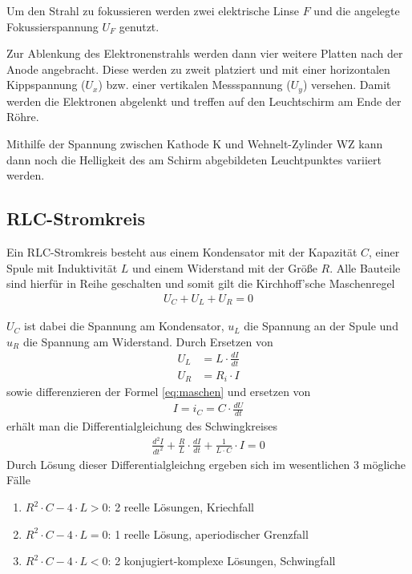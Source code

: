 \documentclass{article}
\begin{document}
Um den Strahl zu fokussieren werden zwei elektrische Linse $F$ und die angelegte Fokussierspannung $U_F$ genutzt.


Zur Ablenkung des Elektronenstrahls werden dann vier weitere Platten nach der Anode angebracht. Diese werden zu zweit platziert und mit einer horizontalen Kippspannung ($U_x$) bzw. einer vertikalen Messspannung ($U_y$) versehen. Damit werden die Elektronen abgelenkt und treffen auf den Leuchtschirm am Ende der Röhre.

Mithilfe der Spannung zwischen Kathode K und Wehnelt-Zylinder WZ kann dann noch die Helligkeit des am Schirm abgebildeten Leuchtpunktes variiert werden. \cite{braun} \cite{uniunterlagen}

\subsection{RLC-Stromkreis}

Ein RLC-Stromkreis besteht aus einem Kondensator mit der Kapazität $C$, einer Spule mit Induktivität $L$ und einem Widerstand mit der Größe $R$. Alle Bauteile sind hierfür in Reihe geschalten und somit gilt die Kirchhoff'sche Maschenregel
\begin{align}
\label{eq:maschen}
U_C + U_L + U_R = 0
\end{align}

$U_C$ ist dabei die Spannung am Kondensator, $u_L$ die Spannung an der Spule und $u_R$ die Spannung am Widerstand. Durch Ersetzen von 
\begin{align*}
U_L &= L \cdot \frac{dI}{dt} \\
U_R &= R_i \cdot I
\end{align*}
sowie differenzieren der Formel \eqref{eq:maschen} und ersetzen von 
\begin{align*}
I = i_C = C \cdot \frac{dU}{dt}
\end{align*}
 erhält man die Differentialgleichung des Schwingkreises
\begin{align}
\frac{d^2I}{dt^2} + \frac{R}{L}\cdot \frac{dI}{dt} + \frac{1}{L\cdot C}\cdot I = 0
\end{align}
Durch Lösung dieser Differentialgleichng ergeben sich im wesentlichen 3 mögliche Fälle
\begin{enumerate}
\item $R^2\cdot C - 4\cdot L > 0$: 2 reelle Lösungen, Kriechfall
\item $R^2\cdot C - 4\cdot L = 0$: 1 reelle Lösung, aperiodischer Grenzfall
\item $R^2\cdot C - 4\cdot L < 0$: 2 konjugiert-komplexe Lösungen, Schwingfall
\end{enumerate}
\end{document}
